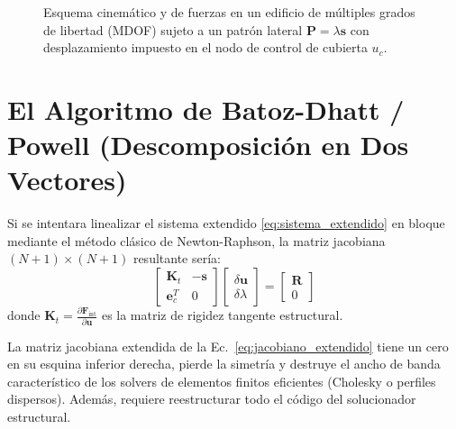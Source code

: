 \documentclass[11pt,letterpaper]{article}
\begin{document}
\begin{figure}[htbp]
\caption{Esquema cinemático y de fuerzas en un edificio de múltiples grados de libertad (MDOF) sujeto a un patrón lateral $\mathbf{P} = \lambda \mathbf{s}$ con desplazamiento impuesto en el nodo de control de cubierta $u_c$.}
\label{fig:edificio_mdof}
\end{figure}

\section{El Algoritmo de Batoz-Dhatt / Powell (Descomposición en Dos Vectores)}

Si se intentara linealizar el sistema extendido \eqref{eq:sistema_extendido} en bloque mediante el método clásico de Newton-Raphson, la matriz jacobiana $(N+1) \times (N+1)$ resultante sería:
\begin{equation}
    \begin{bmatrix}
        \mathbf{K}_t & -\mathbf{s} \\[4pt]
        \mathbf{e}_c^T & 0
    \end{bmatrix}
    \begin{bmatrix}
        \delta \mathbf{u} \\[4pt]
        \delta \lambda
    \end{bmatrix} =
    \begin{bmatrix}
        \mathbf{R} \\[4pt]
        0
    \end{bmatrix}
    \label{eq:jacobiano_extendido}
\end{equation}
donde $\mathbf{K}_t = \frac{\partial \mathbf{F}_{\text{int}}}{\partial \mathbf{u}}$ es la matriz de rigidez tangente estructural.

\begin{alertbox}
La matriz jacobiana extendida de la Ec.~\eqref{eq:jacobiano_extendido} tiene un cero en su esquina inferior derecha, pierde la simetría y destruye el ancho de banda característico de los solvers de elementos finitos eficientes (Cholesky o perfiles dispersos). Además, requiere reestructurar todo el código del solucionador estructural.
\end{alertbox}
\end{document}
